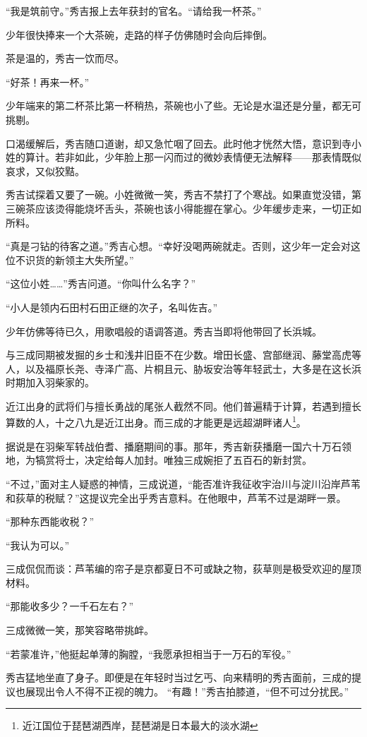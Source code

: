 \documentclass[
]{book}
\begin{document}
``我是筑前守。''秀吉报上去年获封的官名。``请给我一杯茶。''

少年很快捧来一个大茶碗，走路的样子仿佛随时会向后摔倒。

茶是温的，秀吉一饮而尽。

``好茶！再来一杯。''

少年端来的第二杯茶比第一杯稍热，茶碗也小了些。无论是水温还是分量，都无可挑剔。

口渴缓解后，秀吉随口道谢，却又急忙咽了回去。此时他才恍然大悟，意识到寺小姓的算计。若非如此，少年脸上那一闪而过的微妙表情便无法解释------那表情既似哀求，又似狡黠。

秀吉试探着又要了一碗。小姓微微一笑，秀吉不禁打了个寒战。如果直觉没错，第三碗茶应该烫得能烧坏舌头，茶碗也该小得能握在掌心。少年缓步走来，一切正如所料。

``真是刁钻的待客之道。''秀吉心想。``幸好没喝两碗就走。否则，这少年一定会对这位不识货的新领主大失所望。''

``这位小姓\ldots\ldots{}''秀吉问道。``你叫什么名字？''

``小人是领内石田村石田正继的次子，名叫佐吉。''

少年仿佛等待已久，用歌唱般的语调答道。秀吉当即将他带回了长浜城。

与三成同期被发掘的乡士和浅井旧臣不在少数。增田长盛、宫部继润、藤堂高虎等人，以及福原长尧、寺泽广高、片桐且元、胁坂安治等年轻武士，大多是在这长浜时期加入羽柴家的。

近江出身的武将们与擅长勇战的尾张人截然不同。他们普遍精于计算，若遇到擅长算数的人，十之八九是近江出身。而三成的才能更是远超湖畔诸人\footnote{近江国位于琵琶湖西岸，琵琶湖是日本最大的淡水湖}。

据说是在羽柴军转战伯耆、播磨期间的事。那年，秀吉新获播磨一国六十万石领地，为犒赏将士，决定给每人加封。唯独三成婉拒了五百石的新封赏。

``不过，''面对主人疑惑的神情，三成说道，``能否准许我征收宇治川与淀川沿岸芦苇和荻草的税赋？''这提议完全出乎秀吉意料。在他眼中，芦苇不过是湖畔一景。

``那种东西能收税？''

``我认为可以。''

三成侃侃而谈：芦苇编的帘子是京都夏日不可或缺之物，荻草则是极受欢迎的屋顶材料。

``那能收多少？一千石左右？''

三成微微一笑，那笑容略带挑衅。

``若蒙准许，''他挺起单薄的胸膛，``我愿承担相当于一万石的军役。''

秀吉猛地坐直了身子。即便是在年轻时当过乞丐、向来精明的秀吉面前，三成的提议也展现出令人不得不正视的魄力。
``有趣！''秀吉拍膝道，``但不可过分扰民。''
\end{document}
